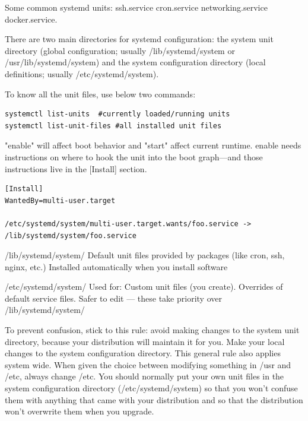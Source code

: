 \documentclass[paper=8.5in:11in, twoside, 12pt, pagesize=pdftex]{book}
\begin{document}
	\par Some common systemd units: ssh.service cron.service networking.service docker.service.
	
	\par There are two main directories for systemd configuration: the system unit directory (global configuration; usually /lib/systemd/system or /usr/lib/systemd/system) and the system configuration directory (local definitions; usually /etc/systemd/system).
	
	\par To know all the unit files, use below two commands:
\begin{lstlisting}
systemctl list-units  #currently loaded/running units
systemctl list-unit-files #all installed unit files
\end{lstlisting}
	
	\par "enable" will affect boot behavior and "start" affect current runtime. enable needs instructions on where to hook the unit into the boot graph—and those instructions live in the [Install] section.
	
\begin{lstlisting}
[Install]
WantedBy=multi-user.target

/etc/systemd/system/multi-user.target.wants/foo.service -> /lib/systemd/system/foo.service
\end{lstlisting}
	
	\par /lib/systemd/system/  Default unit files provided by packages (like cron, ssh, nginx, etc.) Installed automatically when you install software
	
	\par /etc/systemd/system/  Used for: Custom unit files (you create). Overrides of default service files. Safer to edit — these take priority over /lib/systemd/system/

	\par To prevent confusion, stick to this rule: avoid making changes to the system unit directory, because your distribution will maintain it for you. Make your local changes to the system configuration directory. This general rule also applies system wide. When given the choice between modifying something in /usr and /etc, always change /etc. You should normally put your own unit files in the system configuration directory (/etc/systemd/system) so that you won’t confuse them with anything that came with your distribution and so that the distribution won’t overwrite them when you upgrade.
\end{document}
